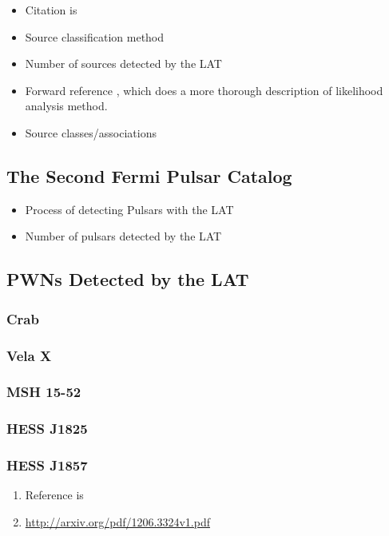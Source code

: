 \begin{itemize}
  \item Citation is \cite{second_lat_catalog_2012}
  \item Source classification method
  \item Number of sources detected by the \ac{LAT}
  \item Forward reference ,
    which does a more thorough description of likelihood analysis method.
  \item Source classes/associations
\end{itemize}

\subsection{The Second Fermi Pulsar Catalog}

\begin{itemize}
  \item Process of detecting Pulsars with the \ac{LAT}
  \item Number of pulsars detected by the \ac{LAT}
\end{itemize}

\subsection{\acsp{PWN} Detected by the \ac{LAT}}

\subsubsection{Crab}

\subsubsection{Vela X}

\subsubsection{MSH 15-52}

\subsubsection{HESS J1825}

\subsubsection{HESS J1857}


\begin{enumerate}
  \item Reference is \cite{hess_j1857_lat_2012}
  \item \url{http://arxiv.org/pdf/1206.3324v1.pdf}
\end{enumerate}
